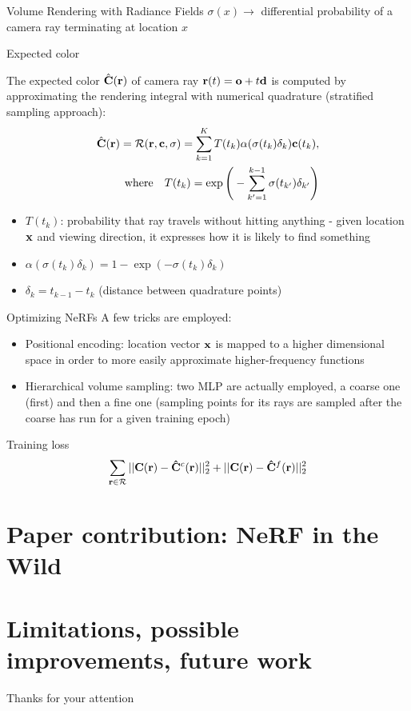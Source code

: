 \documentclass[aspectratio=1610]{beamer}
\newcommand{\parenth}[2][]{#1(#2#1)}
\begin{document}
\begin{frame}{Volume Rendering with Radiance Fields}
    \(\sigma(x) \rightarrow\) differential probability of a camera ray terminating at location \(x\)

    \begin{block}{Expected color}
        
        The expected color \(\hat{\vb{C}}(\vb{r})\) of camera ray \(\vb{r}(t) = \vb{o} + t\vb{d}\) is computed by approximating the rendering integral with numerical quadrature (stratified sampling approach):
        \begin{align}
            \hat{\vb{C}}(\vb{r}) = \mathcal{R}(\vb{r}, \vb{c}, \sigma) = \sum_{k = 1}^{K} T(t_k) \alpha (\sigma (t_k)\delta_k) \vb{c}(t_k),\\
            \textrm{where} \quad T(t_k) = \exp \parenth[\Bigg]{-\sum_{k' = 1}^{k - 1} \sigma (t_{k'}) \delta_{k'}} 
        \end{align}
    \end{block}
    \begin{itemize}
        \item \(T(t_k)\): probability that ray travels without hitting anything - given location \(\vb{x}\) and viewing direction, it expresses how it is likely to find something
        \item \(\alpha(\sigma (t_k)\delta_k) = 1 - \exp(- \sigma (t_k)\delta_k)\) 
        \item \(\delta_k = t_{k-1} - t_k\) (distance between quadrature points)
    \end{itemize}
\end{frame}

\begin{frame}{Optimizing NeRFs}
    A few tricks are employed:
    \begin{itemize}
        \item Positional encoding: location vector \(\vb{x}\) is mapped to a higher dimensional space in order to more easily approximate higher-frequency functions
        \item Hierarchical volume sampling: two MLP are actually employed, a coarse one (first) and then a fine one (sampling points for its rays are sampled after the coarse has run for a given training epoch) 
    \end{itemize}
    \begin{block}{Training loss}
        \begin{equation}
            \sum_{\vb{r} \in \mathcal{R}} ||\vb{C}(\vb{r}) - \vb{\hat{C}}^c(\vb{r})||_2^2 + ||\vb{C}(\vb{r}) - \vb{\hat{C}}^f(\vb{r})||_2^2
        \end{equation}
    \end{block}
\end{frame}

\section{Paper contribution: NeRF in the Wild}
\section{Limitations, possible improvements, future work}
\begin{frame}
    \begin{center}
        Thanks for your attention
    \end{center}
\end{frame}
\end{document}
